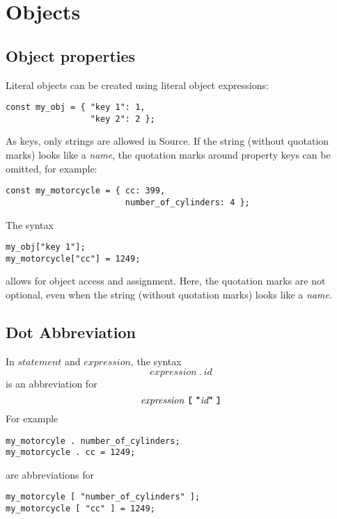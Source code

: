 \section*{Objects}

\subsection*{Object properties}

Literal objects can be created using literal object expressions:
\begin{lstlisting}
const my_obj = { "key 1": 1,
                 "key 2": 2 };
\end{lstlisting}

As keys, only strings are allowed in Source.
If the string (without quotation marks) looks like a \textit{name}, the
quotation marks around property keys can be omitted, for example:
\begin{lstlisting}
const my_motorcycle = { cc: 399,
                        number_of_cylinders: 4 };
\end{lstlisting}

The syntax
\begin{lstlisting}
my_obj["key 1"];
my_motorcycle["cc"] = 1249;
\end{lstlisting}
allows for object access and assignment. Here, the quotation marks are not optional,
even when the string (without quotation marks) looks like a \textit{name}.

\subsection*{Dot Abbreviation}

In $\textit{statement}$ and $\textit{expression}$, the syntax
\[
\textit{expression} \ \texttt{.}\ \textit{id}
\]
is an abbreviation for
\[
\textit{expression} \ \textbf{\texttt{[}}\  \texttt{\bf "} \textit{id}
\texttt{\bf "}\ \textbf{\texttt{]}}
\]
For example
\begin{lstlisting}
my_motorcyle . number_of_cylinders;
my_motorcycle . cc = 1249;
\end{lstlisting}
are abbreviations for
\begin{lstlisting}
my_motorcyle [ "number_of_cylinders" ];
my_motorcycle [ "cc" ] = 1249;
\end{lstlisting}
